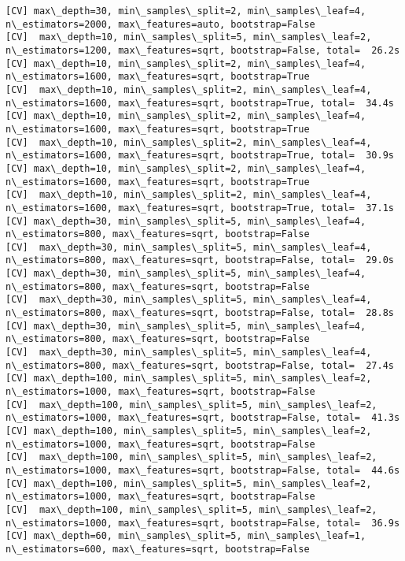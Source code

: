 \documentclass[11pt]{article}
\begin{document}
\begin{Verbatim}[commandchars=\\\{\}]
[CV] max\_depth=30, min\_samples\_split=2, min\_samples\_leaf=4, n\_estimators=2000, max\_features=auto, bootstrap=False 
[CV]  max\_depth=10, min\_samples\_split=5, min\_samples\_leaf=2, n\_estimators=1200, max\_features=sqrt, bootstrap=False, total=  26.2s
[CV] max\_depth=10, min\_samples\_split=2, min\_samples\_leaf=4, n\_estimators=1600, max\_features=sqrt, bootstrap=True 
[CV]  max\_depth=10, min\_samples\_split=2, min\_samples\_leaf=4, n\_estimators=1600, max\_features=sqrt, bootstrap=True, total=  34.4s
[CV] max\_depth=10, min\_samples\_split=2, min\_samples\_leaf=4, n\_estimators=1600, max\_features=sqrt, bootstrap=True 
[CV]  max\_depth=10, min\_samples\_split=2, min\_samples\_leaf=4, n\_estimators=1600, max\_features=sqrt, bootstrap=True, total=  30.9s
[CV] max\_depth=10, min\_samples\_split=2, min\_samples\_leaf=4, n\_estimators=1600, max\_features=sqrt, bootstrap=True 
[CV]  max\_depth=10, min\_samples\_split=2, min\_samples\_leaf=4, n\_estimators=1600, max\_features=sqrt, bootstrap=True, total=  37.1s
[CV] max\_depth=30, min\_samples\_split=5, min\_samples\_leaf=4, n\_estimators=800, max\_features=sqrt, bootstrap=False 
[CV]  max\_depth=30, min\_samples\_split=5, min\_samples\_leaf=4, n\_estimators=800, max\_features=sqrt, bootstrap=False, total=  29.0s
[CV] max\_depth=30, min\_samples\_split=5, min\_samples\_leaf=4, n\_estimators=800, max\_features=sqrt, bootstrap=False 
[CV]  max\_depth=30, min\_samples\_split=5, min\_samples\_leaf=4, n\_estimators=800, max\_features=sqrt, bootstrap=False, total=  28.8s
[CV] max\_depth=30, min\_samples\_split=5, min\_samples\_leaf=4, n\_estimators=800, max\_features=sqrt, bootstrap=False 
[CV]  max\_depth=30, min\_samples\_split=5, min\_samples\_leaf=4, n\_estimators=800, max\_features=sqrt, bootstrap=False, total=  27.4s
[CV] max\_depth=100, min\_samples\_split=5, min\_samples\_leaf=2, n\_estimators=1000, max\_features=sqrt, bootstrap=False 
[CV]  max\_depth=100, min\_samples\_split=5, min\_samples\_leaf=2, n\_estimators=1000, max\_features=sqrt, bootstrap=False, total=  41.3s
[CV] max\_depth=100, min\_samples\_split=5, min\_samples\_leaf=2, n\_estimators=1000, max\_features=sqrt, bootstrap=False 
[CV]  max\_depth=100, min\_samples\_split=5, min\_samples\_leaf=2, n\_estimators=1000, max\_features=sqrt, bootstrap=False, total=  44.6s
[CV] max\_depth=100, min\_samples\_split=5, min\_samples\_leaf=2, n\_estimators=1000, max\_features=sqrt, bootstrap=False 
[CV]  max\_depth=100, min\_samples\_split=5, min\_samples\_leaf=2, n\_estimators=1000, max\_features=sqrt, bootstrap=False, total=  36.9s
[CV] max\_depth=60, min\_samples\_split=5, min\_samples\_leaf=1, n\_estimators=600, max\_features=sqrt, bootstrap=False 

\end{Verbatim}
\end{document}
